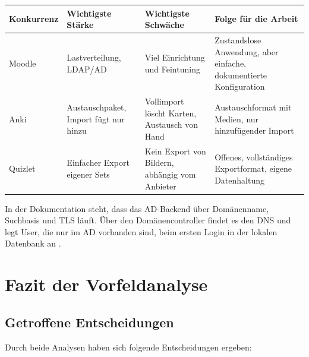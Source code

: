 \begin{center}
\small
\begin{tabular}{|p{2.0cm}|p{3.4cm}|p{3.6cm}|p{4.0cm}|}
\hline
\textbf{Konkurrenz} & \textbf{Wichtigste Stärke} & \textbf{Wichtigste Schwäche} & \textbf{Folge für die Arbeit} \\ \hline
Moodle & Lastverteilung, LDAP/AD & Viel Einrichtung und Feintuning & Zustandslose Anwendung, aber einfache, dokumentierte Konfiguration \\ \hline
Anki & Austauschpaket, Import fügt nur hinzu & Vollimport löscht Karten, Austausch von Hand & Austauschformat mit Medien, nur hinzufügender Import \\ \hline
Quizlet & Einfacher Export eigener Sets & Kein Export von Bildern, abhängig vom Anbieter & Offenes, vollständiges Exportformat, eigene Datenhaltung \\ \hline
\end{tabular}
\end{center}
In der Dokumentation steht, dass das AD-Backend über Domänenname, Suchbasis und TLS läuft. Über den Domänencontroller findet es den DNS und legt User, die nur im AD vorhanden sind, beim ersten Login in der lokalen Datenbank an \parencite{reviewboard-ad}.
 
\section{Fazit der Vorfeldanalyse}
 
\subsection{Getroffene Entscheidungen}
 
Durch beide Analysen haben sich folgende Entscheidungen ergeben:
 
